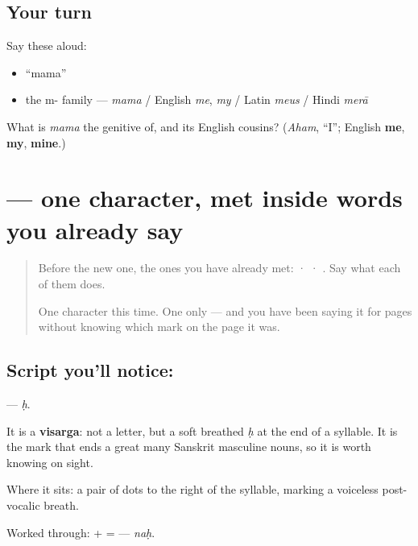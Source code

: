 \subsection*{Your turn}
Say these aloud:

\begin{itemize}
\raggedright
  \item \textquotedblleft{}mama\textquotedblright{}
  \item the m- family — \emph{mama} / English \emph{me}, \emph{my} / Latin \emph{meus} / Hindi \emph{merā}
\end{itemize}

\begin{tcolorbox}[breakable,colback=teal!4,colframe=teal!35!black,title={Before you move on}]
What is \emph{mama} the genitive of, and its English cousins? (\emph{Aham}, \textquotedblleft{}I\textquotedblright{}; English \textbf{me}, \textbf{my}, \textbf{mine}.)
\end{tcolorbox}
\section[\texorpdfstring{\sk{ः} (ḥ)}{ः (ḥ)}]{ — one character, met inside words you already say}

\label{lesson:SA-S201-sign-visarga}



\begin{quote}
Before the new one, the ones you have already met:  ·  · . Say what each of them does.

One character this time. One only — and you have been saying it for pages without knowing which mark on the page it was.
\end{quote}

\subsection*{Script you'll notice: }
\textbf{} — \emph{ḥ}.

It is a \textbf{visarga}: not a letter, but a soft breathed \emph{ḥ} at the end of a syllable. It is the mark that ends a great many Sanskrit masculine nouns, so it is worth knowing on sight.

Where it sits: a pair of dots to the right of the syllable, marking a voiceless post-vocalic breath.

Worked through: \textbf{} + \textbf{} = \textbf{} — \emph{naḥ}.


